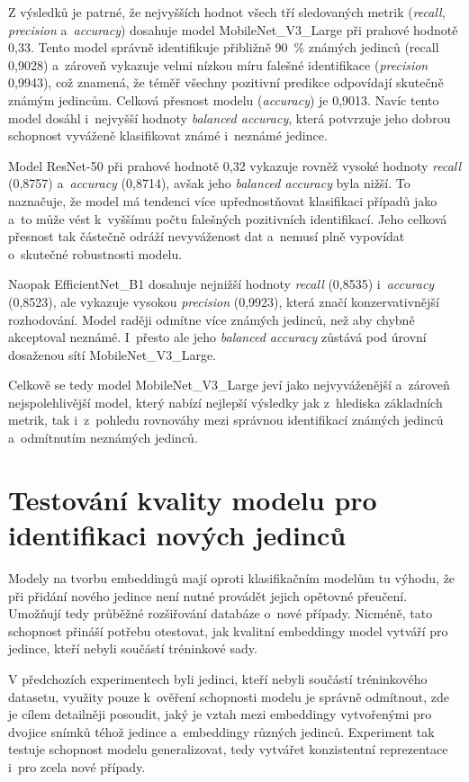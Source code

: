 Z výsledků je patrné, že nejvyšších hodnot všech tří sledovaných metrik (\textit{recall}, \textit{precision} a~\textit{accuracy}) dosahuje model MobileNet\_V3\_Large při prahové hodnotě 0,33. Tento model správně identifikuje přibližně 90~\% známých jedinců (recall 0,9028) a~zároveň vykazuje velmi nízkou míru falešné identifikace (\textit{precision} 0,9943), což znamená, že téměř všechny pozitivní predikce odpovídají skutečně známým jedincům. Celková přesnost modelu (\textit{accuracy}) je 0,9013. Navíc tento model dosáhl i~nejvyšší hodnoty \textit{balanced accuracy}, která potvrzuje jeho dobrou schopnost vyváženě klasifikovat známé i~neznámé jedince.

Model ResNet-50 při prahové hodnotě 0,32 vykazuje rovněž vysoké hodnoty \textit{recall} (0,8757) a~\textit{accuracy} (0,8714), avšak jeho \textit{balanced accuracy} byla nižší. To naznačuje, že model má tendenci více upřednostňovat klasifikaci případů jako  a~to může vést k~vyššímu počtu falešných pozitivních identifikací. Jeho celková přesnost tak částečně odráží nevyváženost dat a~nemusí plně vypovídat o~skutečné robustnosti modelu.

Naopak EfficientNet\_B1 dosahuje nejnižší hodnoty \textit{recall} (0,8535) i~\textit{accuracy} (0,8523), ale vykazuje vysokou \textit{precision} (0,9923), která značí konzervativnější rozhodování. Model raději odmítne více známých jedinců, než aby chybně akceptoval neznámé. I~přesto ale jeho \textit{balanced accuracy} zůstává pod úrovní dosaženou sítí MobileNet\_V3\_Large.

Celkově se tedy model MobileNet\_V3\_Large jeví jako nejvyváženější a~zároveň nejspolehlivější model, který nabízí nejlepší výsledky jak z~hlediska základních metrik, tak i~z~pohledu rovnováhy mezi správnou identifikací známých jedinců a~odmítnutím neznámých jedinců.

\section{Testování kvality modelu pro identifikaci nových jedinců}
\label{newCows}
Modely na tvorbu embeddingů mají oproti klasifikačním modelům tu výhodu, že při přidání nového jedince není nutné provádět jejich opětovné přeučení. Umožňují tedy průběžné rozšiřování databáze o~nové případy. Nicméně, tato schopnost přináší potřebu otestovat, jak kvalitní embeddingy model vytváří pro jedince, kteří nebyli součástí tréninkové sady.

V předchozích experimentech byli jedinci, kteří nebyli součástí tréninkového datasetu, využity pouze k~ověření schopnosti modelu je správně odmítnout, zde je cílem detailněji posoudit, jaký je vztah mezi embeddingy vytvořenými pro dvojice snímků téhož jedince a~embeddingy různých jedinců. Experiment tak testuje schopnost modelu generalizovat, tedy vytvářet konzistentní reprezentace i~pro zcela nové případy.

